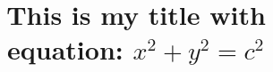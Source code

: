 \title{This is my title with  \\ equation: $x^2+y^2=c^2$}

\newcommand{\yournameTitle}{MAX MUSTERMANN, M.Sc.}
\newcommand{\yourdateTitle}{01.02.2021} %


\newcommand{\yournameDeclaration}{Max Mustermann}
\newcommand{\yourplaceDeclaration}{Karlsruhe}
\newcommand{\yourdateDeclaration}{01.01.2021} %
